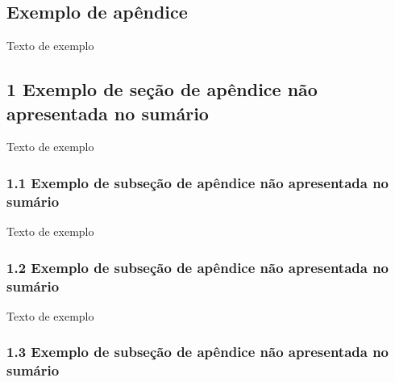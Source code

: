 \documentclass[
	12pt,				%
	oneside,			%
	a4paper,			%
	english,			%
	brazil				%
	]{abntex2ppgsi}
\begin{document}
\begin{apendicesenv}


%
%
%
\chapter{Exemplo de apêndice}

Texto de exemplo

\section*{1 Exemplo de seção de apêndice não apresentada no sumário}

Texto de exemplo

\subsection*{1.1 Exemplo de subseção de apêndice não apresentada no sumário}

Texto de exemplo

\subsection*{1.2 Exemplo de subseção de apêndice não apresentada no sumário}

Texto de exemplo

\subsection*{1.3 Exemplo de subseção de apêndice não apresentada no sumário}


\end{apendicesenv}
\end{document}
